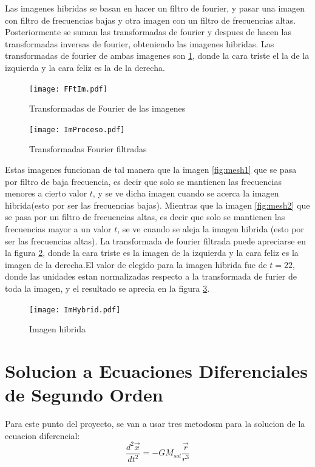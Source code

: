 \documentclass{article}
\begin{document}
Las imagenes hibridas se basan en hacer un filtro de fourier, y pasar una imagen con filtro de frecuencias bajas y otra imagen con un filtro de frecuencias altas. Posteriormente se suman las transformadas de fourier y despues de hacen las transformadas inversas de fourier, obteniendo las imagenes hibridas. Las transformadas de fourier de ambas imagenes son \ref{fig:mesh3}, donde la cara triste el la de la izquierda y la cara feliz es la de la derecha. 
\\
\begin{figure}
    \centering
    \texttt{[image: FFtIm.pdf]}
    \caption{Transformadas de Fourier de las imagenes}
    \label{fig:mesh3}
\end{figure}

\begin{figure}
    \centering
    \texttt{[image: ImProceso.pdf]}
    \caption{Transformadas Fourier filtradas}
    \label{fig:mesh4}
\end{figure}

Estas imagenes funcionan de tal manera que la imagen \ref{fig:mesh1} que se pasa por filtro de baja frecuencia, es decir que solo se mantienen las frecuencias menores a cierto valor $t$, y se ve dicha imagen cuando se acerca la imagen hibrida(esto por ser las frecuencias bajas). Mientras que la imagen \ref{fig:mesh2} que se pasa por un filtro de frecuencias altas, es decir que solo se mantienen las frecuencias mayor a un valor $t$, se ve cuando se aleja la imagen hibrida (esto por ser las frecuencias altas). La transformada de fourier filtrada puede apreciarse en la figura \ref{fig:mesh4}, donde la cara triste es la imagen de la izquierda y la cara feliz es la imagen de la derecha.El valor de elegido para la imagen hibrida fue de $t=22$, donde las unidades estan normalizadas respecto a la transformada de furier de toda la imagen, y el resultado se aprecia en la figura \ref{fig:mesh5}.

\begin{figure}
    \centering
    \texttt{[image: ImHybrid.pdf]}
    \caption{Imagen hibrida}
    \label{fig:mesh5}
\end{figure}

\section{Solucion a Ecuaciones Diferenciales de Segundo Orden}

Para este punto del proyecto, se van a usar tres metodosm para la solucion de la ecuacion diferencial:
\begin{equation}
    \frac{d^2 \vec{x}}{dt^2} = - GM_{sol} \frac{\vec{r}}{r^3}
\end{equation}
\end{document}
